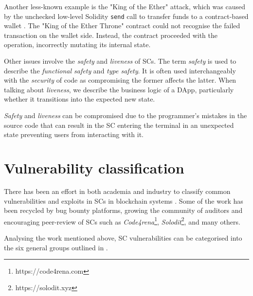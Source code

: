\documentclass[oneside]{ecsproject}     %
\begin{document}
Another less-known example is the "King of the Ether" attack, which was caused by the unchecked low-level Solidity \texttt{send} call to transfer funds to a contract-based wallet \cite{king_of_the_ether}.
The "King of the Ether Throne" contract could not recognise the failed transaction on the wallet side. Instead, the contract proceeded with the operation, incorrectly mutating its internal state.

Other issues involve the \textit{safety} and \textit{liveness} of SCs. 
The term \textit{safety} is used to describe the \textit{functional safety} and \textit{type safety}. It is often used interchangeably with the \textit{security} of code
as compromising the former affects the latter. When talking about \textit{liveness}, we describe the business logic of a DApp, particularly whether it transitions into the expected new state.

\textit{Safety} and \textit{liveness} can be compromised due to the programmer's mistakes in the source code that can result in the SC entering the terminal in an unexpected state
preventing users from interacting with it\cite{ondo_report}.


\section{Vulnerability classification}

There has been an effort in both academia and industry to classify common vulnerabilities 
and exploits in SCs in blockchain systems \cite{owasp}\cite{stefano}\cite{atzei_survey}. 
Some of the work has been recycled by bug bounty platforms, growing the community of auditors
and encouraging peer-review of SCs such as \textit{Code4rena}\footnote{https://code4rena.com}, \textit{Solodit}\footnote{https://solodit.xyz},
and many others.

Analysing the work mentioned above, SC vulnerabilities can be categorised into the six general groups outlined in .
\end{document}
